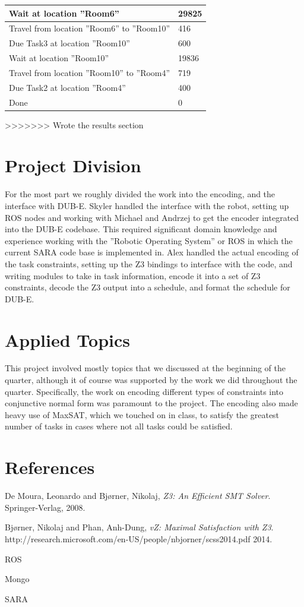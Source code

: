 \documentclass{article}
\begin{document}
\begin{center}
\begin{tabular}{ | p{5cm} | p{5cm} |}
    Wait at location ''Room6'' & 29825 \\ \hline
    Travel from location ''Room6'' to ''Room10'' & 416 \\ \hline
    Due Task3 at location ''Room10'' & 600 \\ \hline
    
    Wait at location ''Room10'' & 19836 \\ \hline
    Travel from location ''Room10'' to ''Room4'' & 719 \\ \hline
    Due Task2 at location ''Room4'' & 400 \\ \hline
    
    Done & 0 \\ \hline
    \end{tabular}
\end{center}

>>>>>>> Wrote the results section

\section{Project Division}
For the most part we roughly divided the work into the encoding,
and the interface with DUB-E.
Skyler handled the interface with the robot,
setting up ROS nodes and working with Michael and Andrzej
to get the encoder integrated
into the DUB-E codebase. This required significant
domain knowledge and experience working with the
''Robotic Operating System'' or ROS in which the
current SARA code base is implemented in.
Alex handled the actual encoding of the task constraints,
setting up the Z3 bindings to interface with the code,
and writing modules to take in task information,
encode it into a set of Z3 constraints,
decode the Z3 output into a schedule,
and format the schedule for DUB-E.


\section{Applied Topics}
This project involved mostly topics
that we discussed at the beginning of the quarter,
although it of course was supported by
the work we did throughout the quarter.
Specifically, the work on encoding different types of constraints
into conjunctive normal form was paramount to the project.
The encoding also made heavy use of MaxSAT,
which we touched on in class,
to satisfy the greatest number of tasks
in cases where not all tasks could be satisfied.


\section{References}
\begin{thebibliography}{9}

  De Moura, Leonardo and Bj{\o}rner, Nikolaj,
  \emph{Z3: An Efficient SMT Solver}.
  Springer-Verlag,
  2008.

  Bj{\o}rner, Nikolaj and Phan, Anh-Dung,
  \emph{vZ: Maximal Satisfaction with Z3}.
  http://research.microsoft.com/en-US/people/nbjorner/scss2014.pdf
  2014.

\end{thebibliography}

ROS

Mongo

SARA
\end{document}
